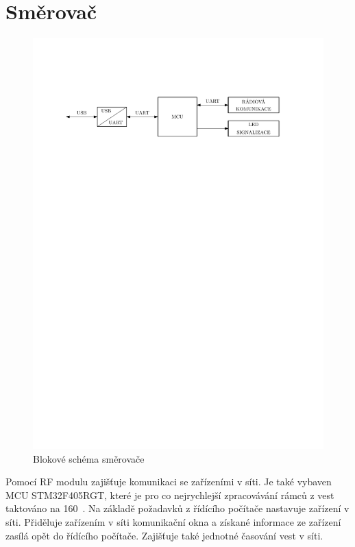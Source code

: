 \section{Směrovač}
\begin{figure}[H]
    \begin{center}
        \includegraphics[width=\textwidth]{img/router}
    \end{center}
    \caption{Blokové schéma směrovače}
\end{figure}
Pomocí RF modulu zajišťuje komunikaci se zařízeními v síti. Je také vybaven MCU STM32F405RGT, které je pro co nejrychlejší zpracovávání rámců z vest taktováno na 160~. Na základě požadavků z řídícího počítače nastavuje zařízení v síti. Přiděluje zařízením v síti komunikační okna a získané informace ze zařízení zasílá opět do řídícího počítače. Zajišťuje také jednotné časování vest v síti.
